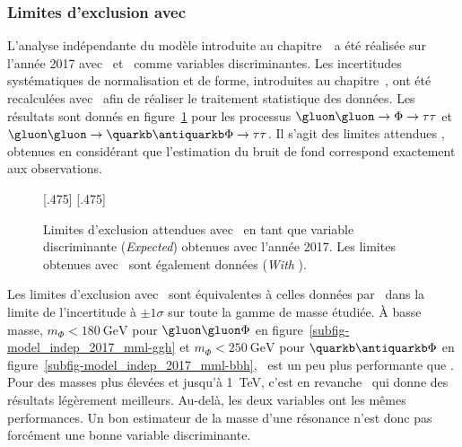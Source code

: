 \subsubsection{Limites d'exclusion avec \mml}
L'analyse indépendante du modèle introduite au chapitre~\ a été réalisée
sur l'année 2017
avec \mTtot\ et \mml\ comme variables discriminantes.
Les incertitudes systématiques de normalisation et de forme, introduites au chapitre~, ont été recalculées avec \mml\ afin de réaliser le traitement statistique des données.
Les résultats
sont donnés en figure~\ref{fig-model_indep_2017_mml}
pour les processus $\gluon\gluon\to\Phi\to\tau\tau$ et $\gluon\gluon\to\quarkb\antiquarkb\Phi\to\tau\tau$.
Il s'agit des limites \og attendues \fg{},
obtenues en considérant que l'estimation du bruit de fond correspond exactement aux observations.
\begin{figure}[b]
\centering

[.475\textwidth]
{\vspace{-\baselineskip}}
\hfill
{}[.475\textwidth]
{\vspace{-\baselineskip}}


\caption[Limites d'exclusion attendues avec \mml\ en 2017.]{Limites d'exclusion attendues avec \mml\ en tant que variable discriminante (\emph{Expected}) obtenues avec l'année 2017. Les limites obtenues avec \mTtot\ sont également données (\emph{With \mTtot}).}
\label{fig-model_indep_2017_mml}
\end{figure}
\par
Les limites d'exclusion avec \mml\ sont équivalentes à celles données par \mTtot\
dans la limite de l'incertitude à $\pm1\sigma$
sur toute la gamme de masse étudiée.
À basse masse,
$m_\Phi<\SI{180}{\GeV}$ pour $\gluon\gluon\Phi$ en figure~\ref{subfig-model_indep_2017_mml-ggh}
et
$m_\Phi<\SI{250}{\GeV}$ pour $\quarkb\antiquarkb\Phi$ en figure~\ref{subfig-model_indep_2017_mml-bbh},
\mml\ est un peu plus performante que \mTtot.
Pour des masses plus élevées et jusqu'à \SI{1}{\TeV},
c'est en revanche \mTtot\ qui donne des résultats légèrement meilleurs.
Au-delà, les deux variables ont les mêmes performances.
Un bon estimateur de la masse d'une résonance n'est donc pas forcément une bonne variable discriminante.
